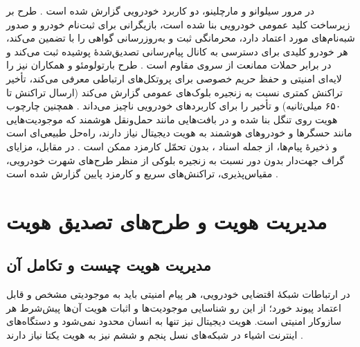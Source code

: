 \documentclass[12pt,a4paper]{article}
\begin{document}
در مرور سیلوانو و مارچلینو، دو کاربرد خودرویی  گزارش شده است \cite{silvanoIotaTangleCryptocurrency2020}. طرح  بر زیرساخت کلید عمومی خودرویی  بنا شده است، بازیگرانی برای ثبت‌نام خودرو و صدور شبه‌نام‌های مورد اعتماد دارد، محرمانگی ثبت و به‌روزرسانی گواهی را با  تضمین می‌کند، هر خودرو کلیدی برای دسترسی به کانال پیام‌رسانی تصدیق‌شدهٔ پوشیده ثبت می‌کند و در برابر حملات ممانعت از سروی مقاوم است \cite{silvanoIotaTangleCryptocurrency2020}. طرح بارتولومئو و همکاران نیز  را لایه‌ای امنیتی و حفظ حریم خصوصی برای پروتکل‌های ارتباطی معرفی می‌کند، تأخیر تراکنش کمتری نسبت به زنجیره بلوک‌های عمومی گزارش می‌کند (ارسال تراکنش تا ۶۵۰ میلی‌ثانیه) و تأخیر را برای کاربرد‌های خودرویی ناچیز می‌داند \cite{silvanoIotaTangleCryptocurrency2020}. همچنین چارچوب هویت  روی تنگل بنا شده و در بافت‌هایی مانند حمل‌ونقل هوشمند که موجودیت‌هایی مانند حسگر‌ها و خودرو‌های هوشمند به هویت دیجیتال نیاز دارند، راه‌حل طبیعی‌ای است و ذخیرهٔ پیام‌ها، از جمله اسناد ، بدون تحمّل کارمزد ممکن است \cite{mazzocca2025survey}. در مقابل، مزایای گراف جهت‌دار بدون دور نسبت به زنجیره بلوکی از منظر طرح‌های شهرت خودرویی، مقیاس‌پذیری، تراکنش‌های سریع و کارمزد پایین گزارش شده است \cite{feraudoDIVADIDbasedReputation2024}.

\section{مدیریت هویت و طرح‌های تصدیق هویت}

\subsection{مدیریت هویت چیست و تکامل آن}

در ارتباطات شبکهٔ اقتضایی خودرویی، هر پیام امنیتی باید به موجودیتی مشخص و قابل اعتماد پیوند خورد؛ از این رو شناسایی موجودیت‌ها و اثبات هویت آن‌ها پیش‌شرط هر سازوکار امنیتی است. هویت دیجیتال نیز تنها به انسان محدود نمی‌شود و دستگاه‌های اینترنت اشیاء در شبکه‌های نسل پنجم و ششم نیز به هویت یکتا نیاز دارند \cite{mazzocca2025survey}.
\end{document}
